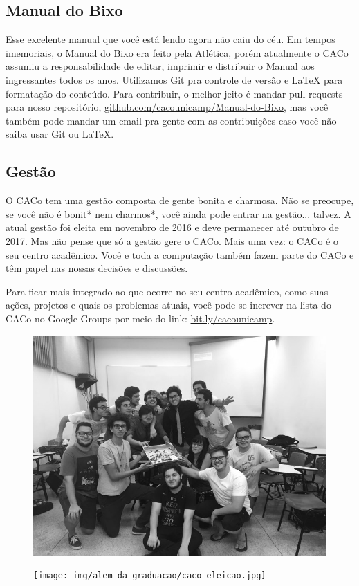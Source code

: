 \subsection{Manual do Bixo}

Esse excelente manual que você está lendo agora não caiu do céu. Em tempos
imemoriais, o Manual do Bixo era feito pela Atlética, porém atualmente o CACo
assumiu a responsabilidade de editar, imprimir e distribuir o Manual aos
ingressantes todos os anos. Utilizamos Git pra controle de versão e {\LaTeX }
para formatação do conteúdo. Para contribuir, o melhor jeito é mandar pull
requests para nosso repositório, \url{github.com/cacounicamp/Manual-do-Bixo},
mas você também pode mandar um email pra gente com as contribuições caso você
não saiba usar Git ou \LaTeX.

\subsection{Gestão}

O CACo tem uma gestão composta de gente bonita e charmosa. Não se preocupe, se
você não é bonit* nem charmos*, você ainda pode entrar na gestão... talvez. A
atual gestão foi eleita em novembro de 2016 e deve permanecer até outubro de
2017. Mas não pense que só a gestão gere o CACo. Mais uma vez: o CACo é o seu
centro acadêmico. Você e toda a computação também fazem parte do CACo e têm
papel nas nossas decisões e discussões.

Para ficar mais integrado ao que ocorre no seu centro acadêmico, como suas
ações, projetos e quais os problemas atuais, você pode se increver na lista do
CACo no Google Groups por meio do link:
\url{bit.ly/cacounicamp}.

\begin{figure}[H]
    \centering
    \includegraphics[width=.45\textwidth]{img/alem_da_graduacao/caco_chapa.jpg}
\end{figure}

\begin{figure}[H]
    \centering
    \texttt{[image: img/alem\_da\_graduacao/caco\_eleicao.jpg]}
\end{figure}

